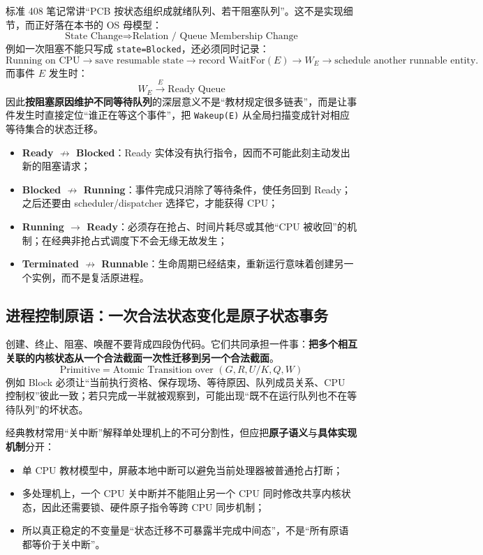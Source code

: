 \documentclass[11pt,a4paper]{ctexart}
\newcommand{\kw}[1]{\textbf{#1}}
\newcommand{\code}[1]{\texttt{#1}}
\begin{document}
标准 408 笔记常讲“PCB 按状态组织成就绪队列、若干阻塞队列”。这不是实现细节，而正好落在本书的 OS 母模型：
\[
\boxed{\text{State Change}\Longrightarrow\text{Relation / Queue Membership Change}}
\]
例如一次阻塞不能只写成 \code{state=Blocked}，还必须同时记录：
\[
\text{Running on CPU}
\rightarrow
\text{save resumable state}
\rightarrow
\text{record WaitFor}(E)
\rightarrow
W_E
\rightarrow
\text{schedule another runnable entity}.
\]
而事件 $E$ 发生时：
\[
W_E\xrightarrow{E}\text{Ready Queue}
\]
因此\kw{按阻塞原因维护不同等待队列}的深层意义不是“教材规定很多链表”，而是让事件发生时直接定位“谁正在等这个事件”，把 \code{Wakeup(E)} 从全局扫描变成针对相应等待集合的状态迁移。

\begin{exam}
\begin{itemize}
\item \kw{Ready $\not\to$ Blocked}：Ready 实体没有执行指令，因而不可能此刻主动发出新的阻塞请求；
\item \kw{Blocked $\not\to$ Running}：事件完成只消除了等待条件，使任务回到 Ready；之后还要由 scheduler/dispatcher 选择它，才能获得 CPU；
\item \kw{Running $\to$ Ready}：必须存在抢占、时间片耗尽或其他“CPU 被收回”的机制；在经典非抢占式调度下不会无缘无故发生；
\item \kw{Terminated $\not\to$ Runnable}：生命周期已经结束，重新运行意味着创建另一个实例，而不是复活原进程。
\end{itemize}
\end{exam}

\subsection{进程控制原语：一次合法状态变化是原子状态事务}

创建、终止、阻塞、唤醒不要背成四段伪代码。它们共同承担一件事：\kw{把多个相互关联的内核状态从一个合法截面一次性迁移到另一个合法截面}。
\[
\boxed{
\text{Primitive}
=
\text{Atomic Transition over }(G,R,U/K,Q,W)
}
\]
例如 Block 必须让“当前执行资格、保存现场、等待原因、队列成员关系、CPU 控制权”彼此一致；若只完成一半就被观察到，可能出现“既不在运行队列也不在等待队列”的坏状态。

经典教材常用“关中断”解释单处理机上的不可分割性，但应把\kw{原子语义}与\kw{具体实现机制}分开：
\begin{itemize}
\item 单 CPU 教材模型中，屏蔽本地中断可以避免当前处理器被普通抢占打断；
\item 多处理机上，一个 CPU 关中断并不能阻止另一个 CPU 同时修改共享内核状态，因此还需要锁、硬件原子指令等跨 CPU 同步机制；
\item 所以真正稳定的不变量是“状态迁移不可暴露半完成中间态”，不是“所有原语都等价于关中断”。
\end{itemize}
\end{document}
